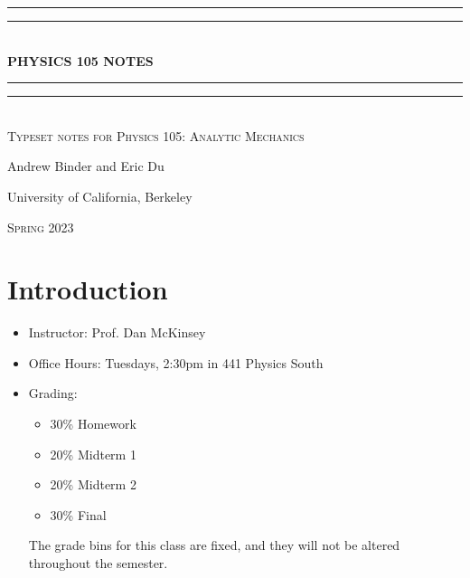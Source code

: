 \documentclass{book}
\begin{document}
    \begin{titlepage}
        \centering
        \vspace*{\baselineskip}\vspace{200pt}
        \rule{\textwidth}{1.6pt}\vspace*{-\baselineskip}\vspace*{2pt}
        \rule{\textwidth}{0.4pt}\\[\baselineskip]
        {\Huge \bfseries \MakeUppercase{Physics 105} NOTES}\\[0.2\baselineskip]
        \rule{\textwidth}{0.4pt}\vspace*{-\baselineskip}\vspace{3.2pt}
        \rule{\textwidth}{1.6pt}\\[\baselineskip]
        \scshape
        Typeset notes for Physics 105: Analytic Mechanics\\
        \par
        \vspace*{2pt}
        {\Large Andrew Binder and Eric Du}\\
        {\large University of California, Berkeley\par}
        {\scshape Spring 2023} \\
    \end{titlepage}
    \setcounter{chapter}{-1}


    \chapter{Introduction}

    \begin{itemize}
        \item Instructor: Prof. Dan McKinsey
        \item Office Hours: Tuesdays, 2:30pm in 441 Physics South
        \item Grading:
        \begin{itemize}
            \item 30\% Homework
            \item 20\% Midterm 1
            \item 20\% Midterm 2
            \item 30\% Final
        \end{itemize}

        The grade bins for this class are fixed, and they will not be altered throughout the semester.
    \end{itemize}

    

     
	
\end{document}
